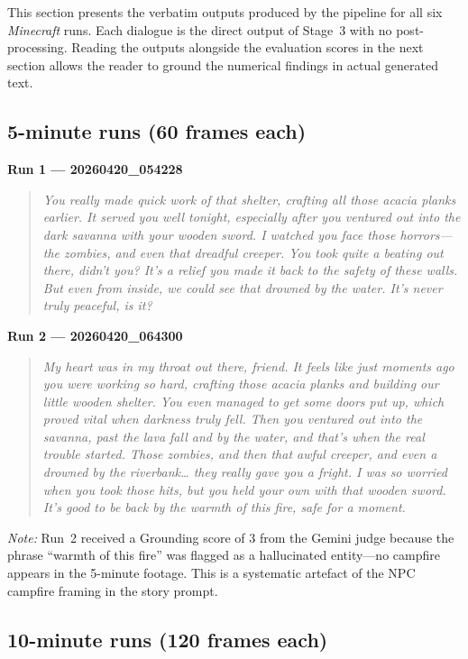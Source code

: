 \documentclass[11pt]{article}
\begin{document}
This section presents the verbatim outputs produced by the pipeline for all six \emph{Minecraft} runs. Each dialogue is the direct output of Stage~3 with no post-processing. Reading the outputs alongside the evaluation scores in the next section allows the reader to ground the numerical findings in actual generated text.

\subsection{5-minute runs (60 frames each)}

\textbf{Run 1 --- 20260420\_054228}
\begin{quote}\itshape
You really made quick work of that shelter, crafting all those acacia planks earlier.
It served you well tonight, especially after you ventured out into the dark savanna
with your wooden sword. I watched you face those horrors---the zombies, and even that
dreadful creeper. You took quite a beating out there, didn't you? It's a relief you
made it back to the safety of these walls. But even from inside, we could see that
drowned by the water. It's never truly peaceful, is it?
\end{quote}

\textbf{Run 2 --- 20260420\_064300}
\begin{quote}\itshape
My heart was in my throat out there, friend. It feels like just moments ago you were
working so hard, crafting those acacia planks and building our little wooden shelter.
You even managed to get some doors put up, which proved vital when darkness truly fell.
Then you ventured out into the savanna, past the lava fall and by the water, and
that's when the real trouble started. Those zombies, and then that awful creeper, and
even a drowned by the riverbank\ldots{} they really gave you a fright. I was so worried
when you took those hits, but you held your own with that wooden sword. It's good to
be back by the warmth of this fire, safe for a moment.
\end{quote}

\noindent\textit{Note:} Run~2 received a Grounding score of 3 from the Gemini judge because the phrase ``warmth of this fire'' was flagged as a hallucinated entity---no campfire appears in the 5-minute footage. This is a systematic artefact of the NPC campfire framing in the story prompt.

\subsection{10-minute runs (120 frames each)}
\end{document}
